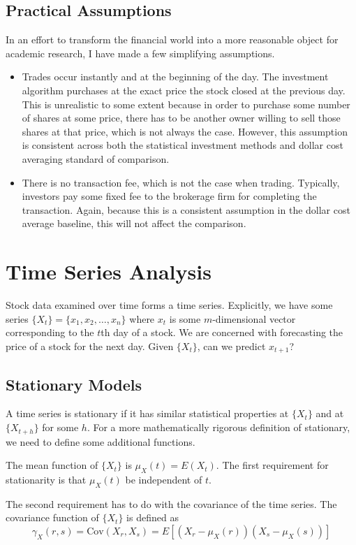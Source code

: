 \documentclass[12pt]{article}
\begin{document}
\subsection{Practical Assumptions}
In an effort to transform the financial world into a more reasonable object for academic research, I have made a few simplifying assumptions.
\begin{itemize}
	\item Trades occur instantly and at the beginning of the day. The investment algorithm purchases at the exact price the stock closed at the previous day. This is unrealistic to some extent because in order to purchase some number of shares at some price, there has to be another owner willing to sell those shares at that price, which is not always the case. However, this assumption is consistent across both the statistical investment methods and dollar cost averaging standard of comparison.
	
	\item There is no transaction fee, which is not the case when trading. Typically, investors pay some fixed fee to the brokerage firm for completing the transaction. Again, because this is a consistent assumption in the dollar cost average baseline, this will not affect the comparison.
			
\end{itemize}
\section{Time Series Analysis}
Stock data examined over time forms a time series. Explicitly, we have some series $\{X_t\} = \{x_1, x_2, \dots, x_n\}$ where $x_t$ is some $m$-dimensional vector corresponding to the $t$th day of a stock. We are concerned with forecasting the price of a stock for the next day. Given $\{X_t\}$, can we predict $x_{t+1}$?

\subsection{Stationary Models}  
A time series is stationary if it has similar statistical properties at $\{X_t\}$ and at $\{X_{t+h}\}$ for some $h$. For a more mathematically rigorous definition of stationary, we need to define some additional functions.

The mean function of $\{X_t\}$ is $\mu_X(t) = E(X_t)$. The first requirement for stationarity is that $\mu_X(t)$ be independent of $t$. 

The second requirement has to do with the covariance of the time series. The covariance function of $\{X_t\}$ is defined as
$$\gamma _X(r,s) = \text{Cov}(X_r, X_s) = E[(X_r - \mu _X(r))(X_s - \mu_X(s))]$$
\end{document}
